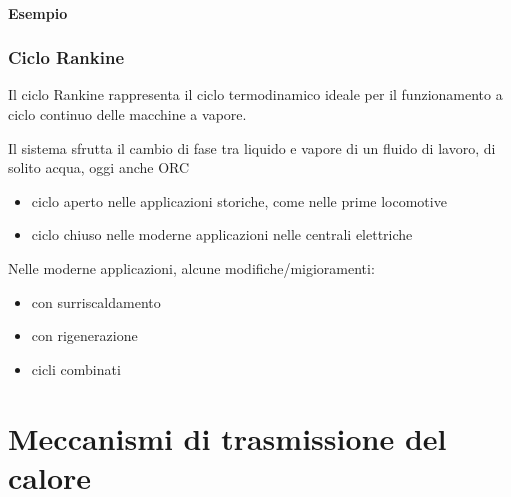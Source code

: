 \documentclass[letterpaper,10pt,italian]{jupyterBook}
\begin{document}
\subsubsection{Esempio}
\label{\detokenize{ch/thermodynamics/heat-engine-joule-brayton:esempio}}
\sphinxAtStartPar
{}

\sphinxstepscope


\subsection{Ciclo Rankine}
\label{\detokenize{ch/thermodynamics/heat-engine-rankine:ciclo-rankine}}\label{\detokenize{ch/thermodynamics/heat-engine-rankine:physics-hs-thermodynamics-heat-engine-rankine}}\label{\detokenize{ch/thermodynamics/heat-engine-rankine::doc}}
\sphinxAtStartPar
Il ciclo Rankine rappresenta il ciclo termodinamico ideale per il funzionamento a ciclo continuo delle macchine a vapore.

\sphinxAtStartPar
Il sistema sfrutta il cambio di fase tra liquido e vapore di un fluido di lavoro, di solito acqua, oggi anche ORC
\begin{itemize}
\item {} 
\sphinxAtStartPar
ciclo aperto nelle applicazioni storiche, come nelle prime locomotive

\item {} 
\sphinxAtStartPar
ciclo chiuso nelle moderne applicazioni nelle centrali elettriche

\end{itemize}

\sphinxAtStartPar
Nelle moderne applicazioni, alcune modifiche/migioramenti:
\begin{itemize}
\item {} 
\sphinxAtStartPar
con surriscaldamento

\item {} 
\sphinxAtStartPar
con rigenerazione

\item {} 
\sphinxAtStartPar
cicli combinati

\end{itemize}

\sphinxstepscope


\chapter{Meccanismi di trasmissione del calore}
\label{\detokenize{ch/thermodynamics/heat-transmission:meccanismi-di-trasmissione-del-calore}}\label{\detokenize{ch/thermodynamics/heat-transmission:physics-hs-thermodynamics-heat-transmission}}\label{\detokenize{ch/thermodynamics/heat-transmission::doc}}
\end{document}
